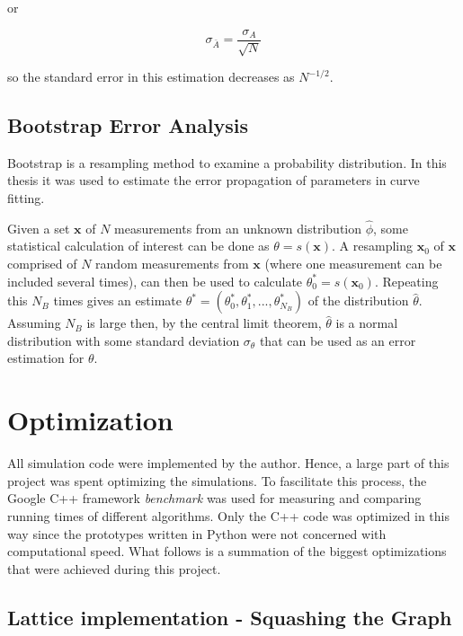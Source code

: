 \noindent or

\begin{equation}
    \sigma_{\bar A} = \frac{\sigma_A}{\sqrt{N}}
\end{equation}

\noindent so the standard error in this estimation decreases as $N^{-1/2}$.

\subsection{Bootstrap Error Analysis}
\label{subsec:Bootstrap}

Bootstrap is a resampling method to examine a probability distribution. In this thesis it was used to estimate the error propagation of parameters in curve fitting.

Given a set $\bm x$ of $N$ measurements from an unknown distribution $\hat \phi$, some statistical calculation of interest can be done as $\theta = s(\bm x)$. A resampling $\bm x_0$ of $\bm x$ comprised of $N$ random measurements from $\bm x$ (where one measurement can be included several times), can then be used to calculate $\theta^*_0 = s(\bm x_0)$. Repeating this $N_B$ times gives an estimate $\theta^* = (\theta^*_0, \theta^*_1, ..., \theta^*_{N_B})$ of the distribution $\hat \theta$. Assuming $N_B$ is large then, by the central limit theorem, $\hat \theta$ is a normal distribution with some standard deviation $\sigma_\theta$ that can be used as an error estimation for $\theta$.

\section{Optimization}
\label{sec:Optimization}

All simulation code were implemented by the author. Hence, a large part of this project was spent optimizing the simulations. To fascilitate this process, the Google C++ framework \textit{benchmark} was used for measuring and comparing running times of different algorithms. Only the C++ code was optimized in this way since the prototypes written in Python were not concerned with computational speed. What follows is a summation of the biggest optimizations that were achieved during this project.

\subsection{Lattice implementation - Squashing the Graph}
\label{subsec:LatticeImpl}

